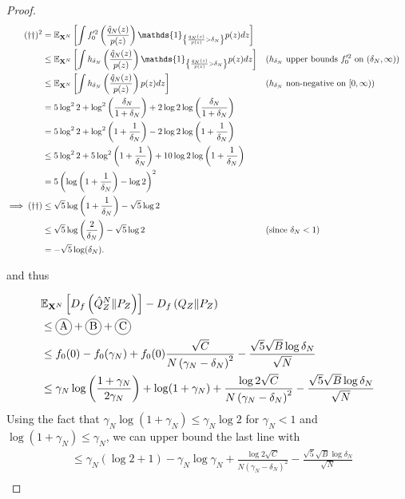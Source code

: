 \begin{proof}
\begin{align*}
    (\dagger\dagger)^2 
    &= \E_{\XN} \left[\int f_0'^2\left(\frac{\hat{q}_N(z)}{p(z)} \right) \mathds{1}_{\left\lbrace \frac{\hat{q}_N(z)}{p(z)} > \delta_N \right\rbrace} p(z) dz \right]
    \\
    &\leq \E_{\XN} \left[\int h_{\delta_N}\left(\frac{\hat{q}_N(z)}{p(z)} \right) \mathds{1}_{\left\lbrace \frac{\hat{q}_N(z)}{p(z)} > \delta_N \right\rbrace} p(z) dz \right]
    && \text{($h_{\delta_N}$ upper bounds $f_0'^2$ on $(\delta_N, \infty)$)}
    \\
    &\leq \E_{\XN} \left[\int h_{\delta_N}\left(\frac{\hat{q}_N(z)}{p(z)} \right) p(z) dz \right]
    && \text{($h_{\delta_N}$ non-negative on $[0, \infty)$)}
    \\
    &= 5\log^2 2 + \log^2\left( \frac{\delta_N}{1+\delta_N} \right) + 2\log 2 \log\left( \frac{\delta_N}{1+\delta_N} \right)\\
    &= 5\log^2 2 + \log^2\left(1 + \frac{1}{\delta_N}\right) - 2\log 2 \log\left(1 + \frac{1}{\delta_N}\right)\\
    &\leq 5\log^2 2 + 5\log^2\left(1 + \frac{1}{\delta_N}\right) + 10\log 2 \log\left(1 + \frac{1}{\delta_N}\right)\\
    &=5\left(\log\left(1 + \frac{1}{\delta_N} \right) - \log 2\right)^2\\
    \implies (\dagger\dagger)&\leq 
    \sqrt{5}\log\left(1 + \frac{1}{\delta_N} \right) - \sqrt{5}\log 2 \\
    &\leq \sqrt{5}\log\left(\frac{2}{\delta_N} \right) - \sqrt{5}\log 2 && \text{(since $\delta_N<1$)}\\
    &= -\sqrt{5}\log(\delta_N).
\end{align*}

and thus

\begin{align*}
    &\E_{\XN} \left[ D_f\left( \hat{Q}_Z^N \| P_Z\right)\right] - D_f\left( Q_{Z} \| P_Z\right)\\
    &\leq \encircle{A} + \encircle{B} + \encircle{C} \\
    &\leq f_0(0) - f_0(\gamma_N) + f_0(0) \frac{\sqrt{C}}{N \left( \gamma_N - \delta_N \right)^2} - \frac{\sqrt{5}\sqrt{B}\log \delta_N}{\sqrt{N}}\\
    &\leq \gamma_N \log\left(\frac{1+\gamma_N}{2\gamma_N}\right) + \log(1+\gamma_N) + \frac{\log2\sqrt{C}}{N \left( \gamma_N - \delta_N \right)^2} - \frac{\sqrt{5}\sqrt{B} \log \delta_N}{\sqrt{N}} \\
\end{align*}
Using the fact that $\gamma_N \log(1+\gamma_N) \leq \gamma_N \log2$ for $\gamma_N < 1$ and $\log(1+ \gamma_N) \leq \gamma_N$, we can upper bound the last line with
\begin{align*}
    &\leq \gamma_N \left(\log2 + 1\right)   - \gamma_N \log \gamma_N  + \frac{\log2\sqrt{C}}{N \left( \gamma_N - \delta_N \right)^2} - \frac{\sqrt{5}\sqrt{B} \log \delta_N}{\sqrt{N}} \\
\end{align*}


\end{proof}
